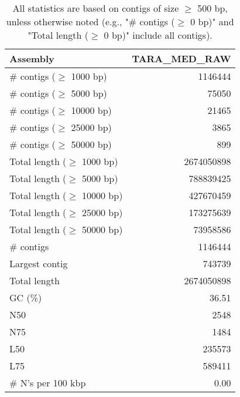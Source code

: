 \documentclass[12pt,a4paper]{article}
\begin{document}
\begin{table}[ht]
\begin{center}
\caption{All statistics are based on contigs of size $\geq$ 500 bp, unless otherwise noted (e.g., "\# contigs ($\geq$ 0 bp)" and "Total length ($\geq$ 0 bp)" include all contigs).}
\begin{tabular}{|l*{1}{|r}|}
\hline
Assembly & TARA\_MED\_RAW \\ \hline
\# contigs ($\geq$ 1000 bp) & 1146444 \\ \hline
\# contigs ($\geq$ 5000 bp) & 75050 \\ \hline
\# contigs ($\geq$ 10000 bp) & 21465 \\ \hline
\# contigs ($\geq$ 25000 bp) & 3865 \\ \hline
\# contigs ($\geq$ 50000 bp) & 899 \\ \hline
Total length ($\geq$ 1000 bp) & 2674050898 \\ \hline
Total length ($\geq$ 5000 bp) & 788839425 \\ \hline
Total length ($\geq$ 10000 bp) & 427670459 \\ \hline
Total length ($\geq$ 25000 bp) & 173275639 \\ \hline
Total length ($\geq$ 50000 bp) & 73958586 \\ \hline
\# contigs & 1146444 \\ \hline
Largest contig & 743739 \\ \hline
Total length & 2674050898 \\ \hline
GC (\%) & 36.51 \\ \hline
N50 & 2548 \\ \hline
N75 & 1484 \\ \hline
L50 & 235573 \\ \hline
L75 & 589411 \\ \hline
\# N's per 100 kbp & 0.00 \\ \hline
\end{tabular}
\end{center}
\end{table}
\end{document}
